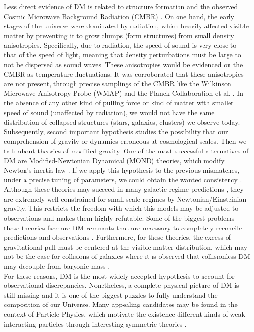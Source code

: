 Less direct evidence of DM is related to structure formation and the observed Cosmic Microwave Background Radiation (CMBR) \cite{Blumenthal_et_al._1984}. On one hand, the early stages of the universe were dominated by radiation, which heavily affected visible matter by preventing it to grow clumps (form structures) from small density anisotropies. Specifically, due to radiation, the speed of sound is very close to that of the speed of light, meaning that density perturbations must be large to not be dispersed as sound waves. These anisotropies would be evidenced on the CMBR as temperature fluctuations. It was corroborated that these anisotropies are not present, through precise samplings of the CMBR like the Wilkinson Microwave Anisotropy Probe (WMAP) \cite{WMAP_2003,WMAP_2013} and the Planck Collaboration et al. \cite{Planck_Collaboration_2014,Planck_Collaboration_2016}. In the absence of any other kind of pulling force or kind of matter with smaller speed of sound (unaffected by radiation), we would not have the same distribution of collapsed structures (stars, galaxies, clusters) we observe today. \\


Subsequently, second important hypothesis studies the possibility that our comprehension of gravity or dynamics erroneous at cosmological scales. Then we talk about theories of modified gravity. One of the most successful alternatives of DM are Modified-Newtonian Dynamical (MOND) theories, which modify Newton's inertia law \cite{Milgrom_1983}. If we apply this hypothesis to the previous mismatches, under a precise tuning of parameters, we could obtain the wanted consistency \cite{Sanders_and_McGaugh_2002}. Although these theories may succeed in many galactic-regime predictions \cite{Begeman_et_al._1991,McGaugh_and_de_Blok_1998,McGaugh_2012}, they are extremely well constrained for small-scale regimes by Newtonian/Einsteinian gravity. This restricts the freedom with which this models may be adjusted to observations and makes them highly refutable. Some of the biggest problems these theories face are DM remnants that are necessary to completely reconcile predictions and observations \cite{Lokas_2002,McGaugh_2015}. Furthermore, for these theories, the excess of gravitational pull must be centered at the visible-matter distribution, which may not be the case for collisions of galaxies where it is observed that collisionless DM may decouple from baryonic mass \cite{Clowe_et_al._2006}.\\

For these reasons, DM is the most widely accepted hypothesis to account for observational discrepancies. Nonetheless, a complete physical picture of DM is still missing and it is one of the biggest puzzles to fully understand the composition of our Universe. Many appealing candidates may be found in the context of Particle Physics, which motivate the existence different kinds of weak-interacting particles through interesting symmetric theories \cite{Kim_1987,Bertone_et_al._2005}.\\

